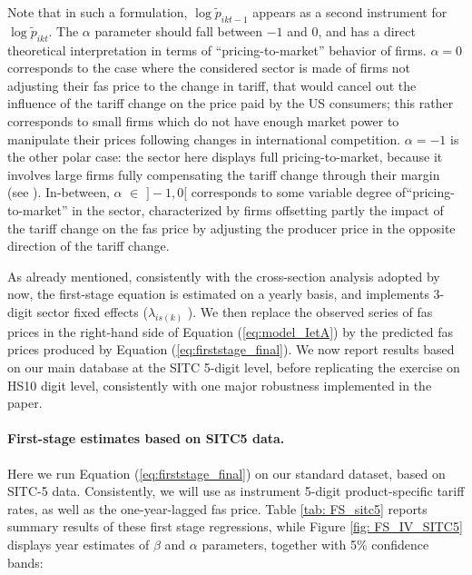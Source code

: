 \documentclass[a4paper,11pt]{article}
\begin{document}
Note that in such a formulation, $\log \widetilde{p}_{ikt-1}$ appears as a second instrument for $\log \widetilde{p}_{ikt}$. The $\alpha$ parameter should fall between $-1$ and $0$, and has a direct theoretical interpretation in terms of ``pricing-to-market'' behavior of firms. $\alpha = 0$ corresponds to the case where the considered sector is made of firms not adjusting their fas price to the change in tariff, that would cancel out the influence of the tariff change on the price paid by the US consumers; this rather corresponds to small firms which do not have enough market power to manipulate their prices following changes in international competition. $\alpha = -1$ is the other polar case: the sector here displays full pricing-to-market, because it involves large firms fully compensating the tariff change through their margin (see \citealp{Berman_Martin_Mayer_2012}).
In-between, $\alpha$ $\in$ $]-1,0[$ corresponds to some variable degree of``pricing-to-market'' in the sector, characterized by firms offsetting partly the impact of the tariff change on the fas price by adjusting the producer price in the opposite direction of the tariff change.

As already mentioned, consistently with the cross-section analysis adopted by now, the first-stage equation is estimated on a yearly basis, and implements 3-digit sector fixed effects ($\lambda_{is(k)}$ ). We then replace the observed series of fas prices in the right-hand side of Equation (\ref{eq:model_IetA}) by the predicted fas prices produced by Equation (\ref{eq:firststage_final}). We now report results based on our main database at the SITC 5-digit level, before replicating the exercise on HS10 digit level, consistently with one major robustness implemented in the paper.

\paragraph{First-stage estimates based on SITC5 data.}

Here we run Equation (\ref{eq:firststage_final}) on our standard dataset, based on SITC-5 data. Consistently, we will use as instrument 5-digit product-specific tariff rates, as well as the one-year-lagged fas price. Table \ref{tab: FS_sitc5} reports summary results of these first stage regressions, while Figure \ref{fig: FS_IV_SITC5} displays year estimates of $\beta$ and $\alpha$ parameters, together with 5\% confidence bands:
\end{document}

